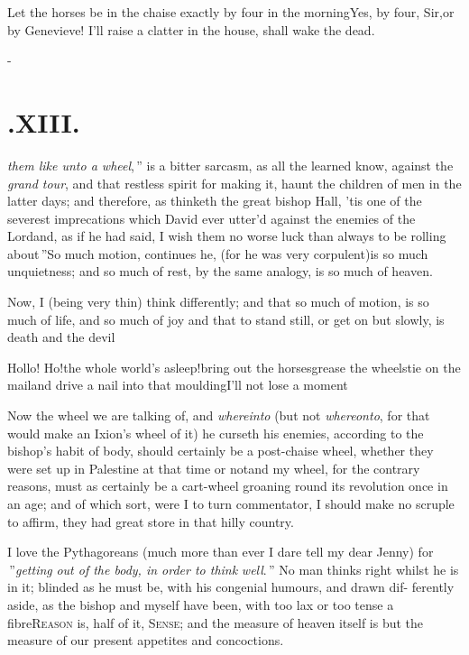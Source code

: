 \documentclass{article}
\begin{document}
Let the horses be in the chaise exactly by four in the
morning\tsh Yes, by four, Sir,\tsh or by
Genevieve! I’ll raise a clatter in the house, shall
wake the dead.

\vfill{}\eject
\null\kern-\baselineskip
\section{.\enspace XIII.}

\textit{them like unto a wheel},\,”\break
is a bitter sarcasm, as all the\break
learned know, against the \textit{grand tour}, 
and that restless spirit for making it,\break
{}\break haunt the
children of men in the latter days; and therefore, as thinketh the great bishop
Hall, ’tis one of the se\-ver\-est imprecations which
David ever utter’d against the enemies of the
Lord\tsk and, as if he had said, \lqq I wish them no\break
\lqq worse luck than always to be rolling\break
\lqq about\,”\tsk So much
motion, continues he, (for he was very corpulent)\tsk is so much
unquietness; and so much of rest, by the same analogy, is so much
of heaven.

Now, I (being very thin) think differently; and that so much of
motion, is so much of life, and so much of joy\break
\tsh and
that to stand still, or get on but slowly, is death and the
devil\tsh

Hollo! Ho!\tsh the whole world’s
asleep!\tsh bring out the horses\tsh grease the
wheels\tsh tie on the mail\tsh and drive a nail
into that moulding\tsh I’ll not lose a
moment\tsh

Now the wheel we are talking of, and \textit{whereinto} (but not
\textit{whereonto}, for that would make an Ixion’s wheel of it)
he curseth his enemies, according to the
bishop’s habit of body, should certainly be a post-chaise wheel, whether they were
set up in Palestine at that time or not\tsh and my wheel, for the contrary reasons,
must as certainly be a cart-wheel groaning round its revolution once in an age; and
of which sort, were I to turn commentator, I should make no scruple to affirm, they
had great store in that hilly country.

I love the Pythagoreans (much more than ever I dare tell my dear Jenny) for\break
{}\break
{}\,”\tsh [their] \lqq \textit{getting}\break
\lqq \textit{out of the body, in order to think}\break
\lqq \textit{well}.\,” No man thinks right whilst he is in it; blinded as
he must be, with his congenial humours, and drawn dif- ferently aside, as the bishop
and myself have been, with too lax or too tense a fibre\tsh \textsc{Reason} is,
half of it, \textsc{Sense}; and the measure of heaven itself is but the measure of
our present appetites and concoctions.\tsh
\end{document}
